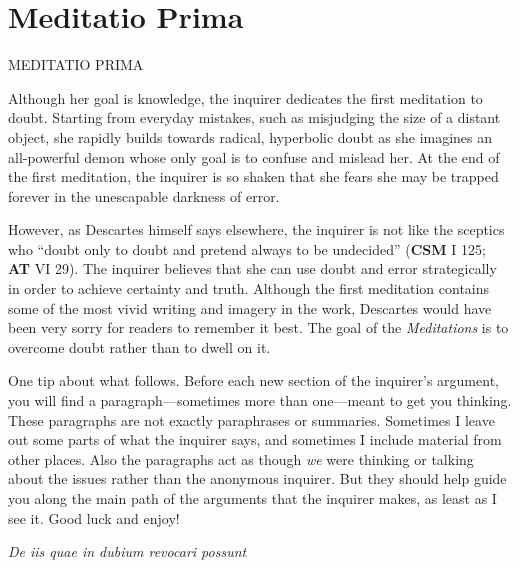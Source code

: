 \chapter{Meditatio Prima}
%
    {\MakeUppercase{Meditatio Prima}}


Although her goal is knowledge, the inquirer dedicates the first meditation to doubt. Starting from everyday mistakes, such as misjudging the size of a distant object, she rapidly builds towards radical, hyperbolic doubt as she imagines an all-powerful demon whose only goal is to confuse and mislead her. At the end of the first meditation, the inquirer is so shaken that she fears she may be trapped forever in the unescapable darkness of error.

However, as Descartes himself says elsewhere, the inquirer is not like the sceptics who ``doubt only to doubt and pretend always to be undecided'' (\textbf{CSM} I 125; \textbf{AT} VI 29). The inquirer believes that she can use doubt and error strategically in order to achieve certainty and truth. Although the first meditation contains some of the most vivid writing and imagery in the work, Descartes would have been very sorry for readers to remember it best. The goal of the \textit{Meditations} is to overcome doubt rather than to dwell on it.

One tip about what follows. Before each new section of the inquirer's argument, you will find a paragraph---sometimes more than one---meant to get you thinking. These paragraphs are not exactly paraphrases or summaries. Sometimes I leave out some parts of what the inquirer says, and sometimes I include material from other places. Also the paragraphs act as though \textit{we} were thinking or talking about the issues rather than the anonymous inquirer. But they should help guide you along the main path of the arguments that the inquirer makes, as least as I see it. Good luck and enjoy!

\clearpage

\begin{center}
    \beginnumbering
    \numberlinefalse
    \pstart
    \textit{De iis quae in dubium revocari possunt}
    \pend
    \endnumbering
\end{center}

